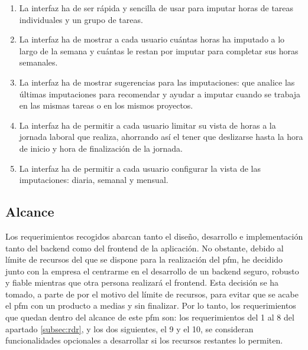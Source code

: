 \begin{enumerate}
 \item La interfaz ha de ser rápida y sencilla de usar para imputar horas de
 tareas individuales y un grupo de tareas.

 \item La interfaz ha de mostrar a cada usuario cuántas horas ha imputado
 a lo largo de la semana y cuántas le restan por imputar para completar sus
 horas semanales.

 \item La interfaz ha de mostrar sugerencias para las imputaciones: que analice
 las últimas imputaciones para recomendar y ayudar a imputar cuando se trabaja
 en las mismas tareas o en los mismos proyectos.

 \item La interfaz ha de permitir a cada usuario limitar su vista de horas a la
 jornada laboral que realiza, ahorrando así el tener que deslizarse hasta la
 hora de inicio y hora de finalización de la jornada.

 \item La interfaz ha de permitir a cada usuario configurar la vista de las
 imputaciones: diaria, semanal y mensual.
\end{enumerate}

\subsection{Alcance}
Los requerimientos recogidos abarcan tanto el diseño, desarrollo e
implementación tanto del \gls{backend} como del \gls{frontend} de la
aplicación. No obstante, debido al límite de recursos del que se dispone
para la realización del \gls{pfm}, he decidido junto con la empresa el
centrarme en el desarrollo de un \gls{backend} seguro, robusto y fiable
mientras que otra persona realizará el \gls{frontend}. Esta decisión se ha
tomado, a parte de por el motivo del límite de recursos, para evitar que
se acabe el \gls{pfm} con un producto a medias y sin finalizar. Por lo tanto,
los requerimientos que quedan dentro del alcance de este \gls{pfm} son: los
requerimientos del 1 al 8 del apartado \ref{subsec:rdr}, y los dos siguientes,
el 9 y el 10, se consideran funcionalidades opcionales a desarrollar si los
recursos restantes lo permiten.

